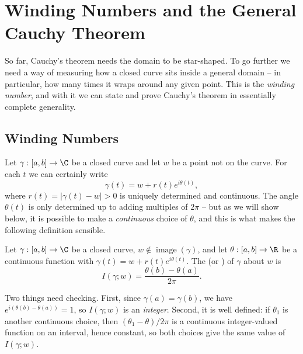\section{Winding Numbers and the General Cauchy Theorem}

So far, Cauchy's theorem needs the domain to be star-shaped. To go further we need a way of measuring how a closed curve sits inside a general domain -- in particular, how many times it wraps around any given point. This is the \emph{winding number}, and with it we can state and prove Cauchy's theorem in essentially complete generality.

\subsection{Winding Numbers}

Let $\gamma: [a, b] \rightarrow \C$ be a closed curve and let $w$ be a point not on the curve. For each $t$ we can certainly write
$$
\gamma(t) = w + r(t)e^{i \theta(t)},
$$
where $r(t) = |\gamma(t) - w| > 0$ is uniquely determined and continuous. The angle $\theta(t)$ is only determined up to adding multiples of $2\pi$ -- but as we will show below, it is possible to make a \emph{continuous} choice of $\theta$, and this is what makes the following definition sensible.

\begin{definition}
    Let $\gamma : [a, b] \rightarrow \C$ be a closed curve, $w \notin \operatorname{image}(\gamma)$, and let $\theta: [a, b] \rightarrow \R$ be a continuous function with $\gamma(t) = w + r(t)e^{i\theta(t)}$. The  (or ) of $\gamma$ about $w$ is
    $$
    I(\gamma; w) = \frac{\theta(b) - \theta(a)}{2 \pi}.
    $$
\end{definition}

Two things need checking. First, since $\gamma(a) = \gamma(b)$, we have $e^{i(\theta(b) - \theta(a))} = 1$, so $I(\gamma; w)$ is an \emph{integer}. Second, it is well defined: if $\theta_1$ is another continuous choice, then $(\theta_1 - \theta)/2\pi$ is a continuous integer-valued function on an interval, hence constant, so both choices give the same value of $I(\gamma; w)$.

\begin{center}
\end{center}

